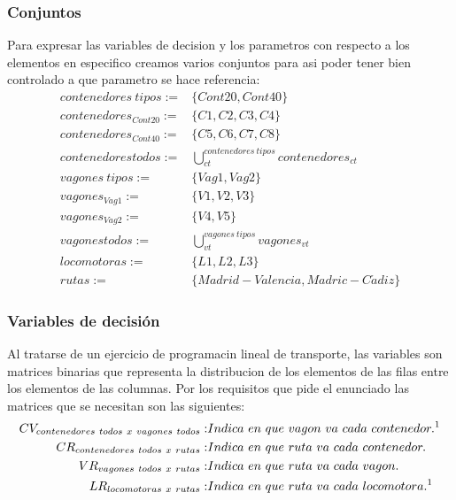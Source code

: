 \documentclass[11pt,spanish]{article}
\begin{document}
			\subsubsection{Conjuntos}
			Para expresar las variables de decision y los parametros con respecto a los elementos en especifico creamos varios conjuntos para asi poder tener bien controlado a que parametro se hace referencia:
			\begin{align*}
				contenedores\ tipos :=& \{ Cont20, Cont40 \} \\
				contenedores_{Cont20} :=& \{ C1, C2, C3, C4 \} \\
				contenedores_{Cont40} :=& \{ C5, C6, C7, C8 \} \\
				contenedores todos :=& \bigcup_{ct}^{contenedores\ tipos} contenedores_{ct} \\
				vagones\ tipos :=& \{ Vag1, Vag2 \} \\
				vagones_{Vag1} :=& \{ V1, V2, V3 \} \\
				vagones_{Vag2} :=& \{ V4, V5 \} \\
				vagones todos :=& \bigcup_{vt}^{vagones\ tipos} vagones_{vt} \\
				locomotoras :=& \{ L1, L2, L3 \} \\
				rutas :=& \{ Madrid-Valencia, Madric-C\acute{a}diz \}
			\end{align*}
			\subsubsection{Variables de decisión}
			Al tratarse de un ejercicio de programacin lineal de transporte, las variables son matrices binarias que representa la distribucion de los elementos de las filas entre los elementos de las columnas. Por los requisitos que pide el enunciado las matrices que se necesitan son las siguientes:
			\begin{align*}
				CV_{contenedores\ todos\ x\ vagones\ todos} :& Indica\ en\ que\ vagon\ va\ cada\ contenedor.\text{\footnotemark} \\
				CR_{contenedores\ todos\ x\ rutas} :& Indica\ en\ que\ ruta\ va\ cada\ contenedor.\\
				VR_{vagones\ todos\ x\ rutas} :& Indica\ en\ que\ ruta\ va\ cada\ vagon.\\
				LR_{locomotoras\ x\ rutas} :& Indica\ en\ que\ ruta\ va\ cada\ locomotora.^1
			\end{align*}
\end{document}
